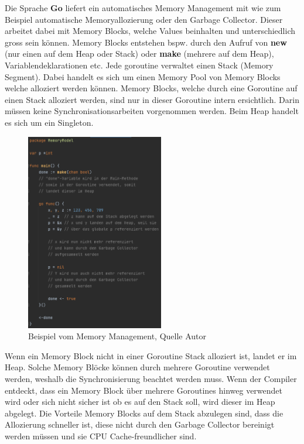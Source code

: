 \documentclass[12pt,titlepage]{article}
\begin{document}
Die Sprache \textbf{Go} liefert ein automatisches Memory Management mit wie zum Beispiel automatische Memoryallozierung oder den Garbage Collector.
Dieser arbeitet dabei mit Memory Blocks, welche Values beinhalten und unterschiedlich gross sein können.
Memory Blocks entstehen bspw. durch den Aufruf von \textbf{new} (nur einen auf dem Heap oder Stack) oder \textbf{make} (mehrere auf dem Heap), Variablendeklarationen etc.
Jede goroutine verwaltet einen Stack (Memory Segment).
Dabei handelt es sich um einen Memory Pool von Memory Blocks welche alloziert werden können.
Memory Blocks, welche durch eine Goroutine auf einen Stack alloziert werden, sind nur in dieser Goroutine intern ersichtlich.
Darin müssen keine Synchronisationsarbeiten vorgenommen werden.
Beim Heap handelt es sich um ein Singleton.
\begin{figure}
	\centering
	\includegraphics[width=6cm]{memorymodel}
	\caption{Beispiel vom Memory Management, Quelle Autor}\label{memorymodel}
\end{figure}
Wenn ein Memory Block nicht in einer Goroutine Stack alloziert ist, landet er im Heap.
Solche Memory Blöcke können durch mehrere Goroutine verwendet werden, weshalb die Synchronisierung beachtet werden muss.
Wenn der Compiler entdeckt, dass ein Memory Block über mehrere Goroutines hinweg verwendet wird oder sich nicht sicher ist ob es auf den Stack soll, wird dieser im Heap abgelegt.
Die Vorteile Memory Blocks auf dem Stack abzulegen sind, dass die Allozierung schneller ist, diese nicht durch den Garbage Collector bereinigt werden müssen und sie CPU Cache-freundlicher sind.
\end{document}
